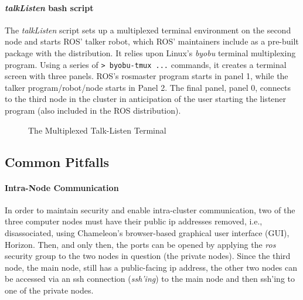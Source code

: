 \documentclass[9pt,twocolumn,twoside]{../../styles/osajnl}
\begin{document}
\paragraph{\textit{talkListen} bash script}
The \textit{talkListen} script sets up a multiplexed terminal environment on the second node and starts ROS' talker robot, which ROS' maintainers include as a pre-built package with the distribution.  It relies upon Linux's \textit{byobu} terminal multiplexing program.  Using a series of { \lstinline[style=BashInputStyle]!> byobu-tmux ...! } commands, it creates a terminal screen with three panels.  ROS's rosmaster program starts in panel 1, while the talker program/robot/node starts in Panel 2.  The final panel, panel 0, connects to the third node in the cluster in anticipation of the user starting the listener program (also included in the ROS distribution).

\begin{figure}[htbp]
\centering
{}
\caption{The Multiplexed Talk-Listen Terminal}
\label{fig:byobu}
\end{figure}

\subsection{Common Pitfalls}
\paragraph{Intra-Node Communication}
In order to maintain security and enable intra-cluster communication, two of the three computer nodes must have their public ip addresses removed, i.e., disassociated, using Chameleon's browser-based graphical user interface (GUI), Horizon.  Then, and only then, the ports can be opened by applying the \textit{ros} security group to the two nodes in question (the private nodes).  Since the third node, the main node, still has a public-facing ip address, the other two nodes can be accessed via an ssh connection (\textit{ssh'ing}) to the main node and then ssh'ing to one of the private nodes.
\end{document}
